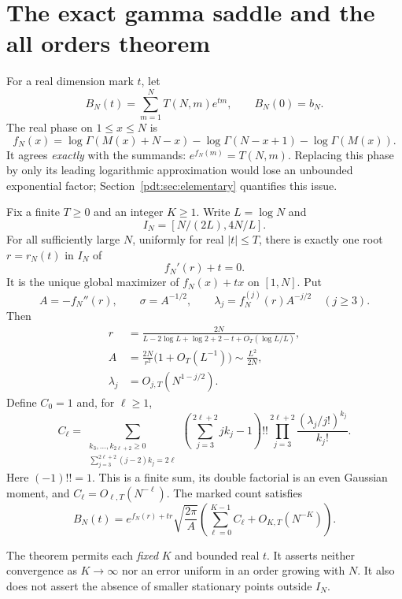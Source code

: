 \section{The exact gamma saddle and the all orders theorem}
\label{pdt:sec:saddle}
For a real dimension mark $t$, let
\begin{equation}\label{pdt:eq:marked}
 B_N(t)=\sum_{m=1}^N T(N,m)e^{tm},\qquad B_N(0)=b_N.
\end{equation}
The real phase on $1\le x\le N$ is
\begin{equation}\label{pdt:eq:phase}
 f_N(x)=\log\Gamma(M(x)+N-x)-\log\Gamma(N-x+1)-\log\Gamma(M(x)).
\end{equation}
It agrees \emph{exactly} with the summands: $e^{f_N(m)}=T(N,m)$. Replacing this phase by only its leading logarithmic approximation would lose an unbounded exponential factor; Section~\ref{pdt:sec:elementary} quantifies this issue.

\begin{theorem}\label{pdt:thm:main}
Fix a finite $T\ge0$ and an integer $K\ge1$. Write $L=\log N$ and
\[
 I_N=[N/(2L),4N/L].
\]
For all sufficiently large $N$, uniformly for real $|t|\le T$, there is exactly one root $r=r_N(t)$ in $I_N$ of
\begin{equation}\label{pdt:eq:saddle}
 f_N'(r)+t=0.
\end{equation}
It is the unique global maximizer of $f_N(x)+tx$ on $[1,N]$. Put
\begin{equation}\label{pdt:eq:standard}
 A=-f_N''(r),\qquad \sigma=A^{-1/2},\qquad
 \lambda_j=f_N^{(j)}(r)A^{-j/2}\quad(j\ge3).
\end{equation}
Then
\begin{align}
 r&=\frac{2N}{L-2\log L+\log2+2-t+O_T(\log L/L)},\label{pdt:eq:rscale}\\
 A&=\frac{2N}{r^2}\bigl(1+O_T(L^{-1})\bigr)\sim\frac{L^2}{2N},\label{pdt:eq:Ascale}\\
 \lambda_j&=O_{j,T}(N^{1-j/2}).\label{pdt:eq:lamscale}
\end{align}
Define $C_0=1$ and, for $\ell\ge1$,
\begin{equation}\label{pdt:eq:contraction}
 C_\ell=\sum_{\substack{k_3,\ldots,k_{2\ell+2}\ge0\\
                 \sum_{j=3}^{2\ell+2}(j-2)k_j=2\ell}}
 \left(\sum_{j=3}^{2\ell+2}jk_j-1\right)!!
 \prod_{j=3}^{2\ell+2}\frac{(\lambda_j/j!)^{k_j}}{k_j!}.
\end{equation}
Here $(-1)!!=1$. This is a finite sum, its double factorial is an even Gaussian moment, and $C_\ell=O_{\ell,T}(N^{-\ell})$. The marked count satisfies
\begin{equation}\label{pdt:eq:main}
 B_N(t)=e^{f_N(r)+tr}\sqrt{\frac{2\pi}{A}}
 \left(\sum_{\ell=0}^{K-1}C_\ell+O_{K,T}(N^{-K})\right).
\end{equation}
\end{theorem}
The theorem permits each \emph{fixed} $K$ and bounded real $t$. It asserts neither convergence as $K\to\infty$ nor an error uniform in an order growing with $N$. It also does not assert the absence of smaller stationary points outside $I_N$.

